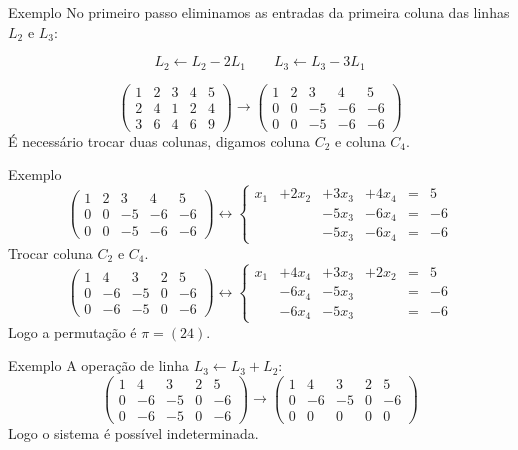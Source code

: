 \documentclass{beamer}
\begin{document}
\begin{frame}{Exemplo}
No primeiro passo eliminamos as entradas da primeira coluna das linhas $L_2$ e $L_3$:

$$ L_2 \leftarrow L_2 - 2L_1 \qquad L_3 \leftarrow L_3 - 3L_1$$

$$\left( \begin{array}{rrrr|r}
1 & 2& 3& 4& 5 \\
2&  4& 1& 2& 4 \\
3& 6& 4& 6& 9 
\end{array}\right)
\rightarrow 
\left( \begin{array}{rrrr|r}
1 & 2& 3& 4& 5 \\
0&  0& -5& -6& -6 \\
0& 0& -5& -6& -6 
\end{array}\right)$$
É necessário trocar duas colunas, digamos coluna $C_2$ e coluna $C_4$.
\end{frame}


\begin{frame}{Exemplo}
$$\left( \begin{array}{rrrr|r}
1 & 2& 3& 4& 5 \\
0&  0& -5& -6& -6 \\
0& 0& -5& -6& -6 
\end{array}\right)
\leftrightarrow 
\left\{ \begin{array}{rrrrcr}
x_1 & +2x_2  &+3x_3 &+4x_4 &=&5 \\
    &        &-5x_3 &-6x_4 &=&-6 \\
    &        &-5x_3 &-6x_4 &=&-6 
\end{array}\right.$$
Trocar coluna $C_2$ e $C_4$.
$$\left( \begin{array}{rrrr|r}
1 & 4& 3& 2& 5 \\
0&  -6& -5& 0& -6 \\
0& -6& -5& 0& -6 
\end{array}\right)
\leftrightarrow 
\left\{ \begin{array}{rrrrcr}
x_1 &   +4x_4 &+3x_3 &+2x_2 &=&5 \\
    &   -6x_4      &-5x_3 & &=&-6 \\
    &    -6x_4     &-5x_3 &&=&-6 
\end{array}\right.$$
Logo a permutação é $\pi=(24)$.
\end{frame}


\begin{frame}{Exemplo}
A operação de linha $L_3 \leftarrow L_3+L_2$:
$$\left( \begin{array}{rrrr|r}
1 & 4& 3& 2& 5 \\
0&  -6& -5& 0& -6 \\
0& -6& -5& 0& -6 
\end{array}\right)
\rightarrow 
\left( \begin{array}{rrrr|r}
1 & 4& 3& 2& 5 \\
0&  -6& -5& 0& -6 \\
0& 0& 0& 0& 0 
\end{array}\right)$$
Logo o sistema é possível indeterminada.
\end{frame}
\end{document}
